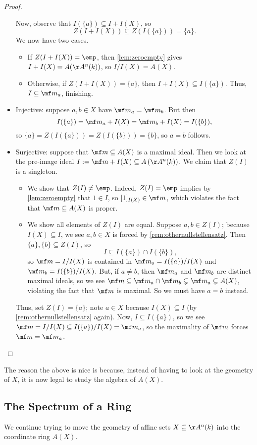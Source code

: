 \documentclass[../notes.tex]{subfiles}
\begin{document}
\begin{proof}
\begin{itemize}
		Now, observe that $I(\{a\})\subseteq I+I(X)$, so
		\[Z(I+I(X))\subseteq Z(I(\{a\}))=\{a\}.\]
		We now have two cases.
		\begin{itemize}
			\item If $Z(I+I(X))=\emp$, then \autoref{lem:zeroempty} gives $I+I(X)=A(\AA^n(k))$, so $I/I(X)=A(X)$.
			\item Otherwise, if $Z(I+I(X))=\{a\}$, then $I+I(X)\subseteq I(\{a\})$. Thus, $I\subseteq\mf m_a$, finishing.
		\end{itemize}
		\item Injective: suppose $a,b\in X$ have $\mf m_a=\mf m_b$. But then
		\[I(\{a\})=\mf m_a+I(X)=\mf m_b+I(X)=I(\{b\}),\]
		so $\{a\}=Z(I(\{a\}))=Z(I(\{b\}))=\{b\}$, so $a=b$ follows.
		\item Surjective: suppose that $\mf m\subseteq A(X)$ is a maximal ideal. Then we look at the pre-image ideal $I:=\mf m+I(X)\subseteq A\left(\AA^n(k)\right)$. We claim that $Z(I)$ is a singleton.
		\begin{itemize}
			\item We show that $Z(I)\ne\emp$. Indeed, $Z(I)=\emp$ implies by \autoref{lem:zeroempty} that $1\in I$, so $[1]_{I(X)}\in\mf m$, which violates the fact that $\mf m\subseteq A(X)$ is proper.
			\item We show all elements of $Z(I)$ are equal. Suppose $a,b\in Z(I)$; because $I(X)\subseteq I$, we see $a,b\in X$ is forced by \autoref{rem:othernullstellensatz}. Then $\{a\},\{b\}\subseteq Z(I)$, so
			\[I\subseteq I(\{a\})\cap I(\{b\}),\]
			so $\mf m=I/I(X)$ is contained in $\mf m_a=I(\{a\})/I(X)$ and $\mf m_b=I(\{b\})/I(X)$. But, if $a\ne b$, then $\mf m_a$ and $\mf m_b$ are distinct maximal ideals, so we see $\mf m\subseteq\mf m_a\cap\mf m_b\subsetneq\mf m_a\subsetneq A(X)$, violating the fact that $\mf m$ is maximal. So we must have $a=b$ instead.
		\end{itemize}
		Thus, set $Z(I)=\{a\}$; note $a\in X$ because $I(X)\subseteq I$ (by \autoref{rem:othernullstellensatz} again). Now, $I\subseteq I(\{a\})$, so we see $\mf m=I/I(X)\subseteq I(\{a\})/I(X)=\mf m_a$, so the maximality of $\mf m$ forces $\mf m=\mf m_a$.
		\qedhere
	\end{itemize}
\end{proof}
The reason the above is nice is because, instead of having to look at the geometry of $X$, it is now legal to study the algebra of $A(X)$.

\subsection{The Spectrum of a Ring}
We continue trying to move the geometry of affine sets $X\subseteq\AA^n(k)$ into the coordinate ring $A(X)$.
\end{document}
